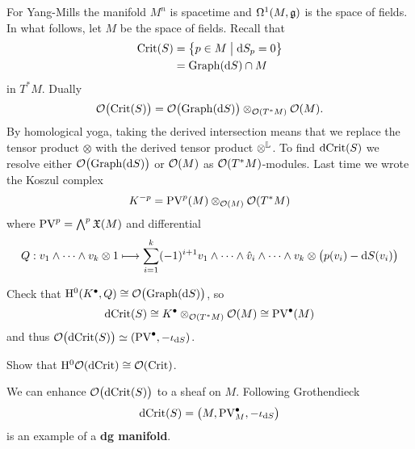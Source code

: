For Yang-Mills the manifold $M^n$ is spacetime and $\Omega^1(M, \mathfrak{g})$ is the space of fields. In what follows, let $M$ be the space of fields. Recall that
\begin{align*}
  \operatorname{Crit}(S) &= \bigl\{ p \in M \bigm| \mathrm{d} S_p = 0 \bigr\} \\
           &= \operatorname{Graph} (\mathrm{d} S) \cap M
\end{align*}
in $T^* M$. Dually
\begin{equation*}
  \mathcal{O} \bigl( \operatorname{Crit}(S) \bigr)
  = \mathcal{O} \bigl( \operatorname{Graph} (\mathrm{d} S) \bigr) \otimes_{\mathcal{O}(T^* M)} \mathcal{O}(M).
\end{equation*}
By homological yoga, taking the derived intersection means that we replace the tensor product $\otimes$ with the derived tensor product $\otimes^{\mathbb{L}}$. To find $\operatorname{dCrit} (S)$ we resolve either $\mathcal{O} \bigl( \operatorname{Graph} (\mathrm{d} S) \bigr)$ or $\mathcal{O}(M)$ as $\mathcal{O}(T^* M)$-modules. Last time we wrote the Koszul complex
\begin{equation*}
  K^{-p} = \operatorname{PV}^p (M) \otimes_{\mathcal{O}(M)} \mathcal{O} (T^* M)
\end{equation*}
where $\operatorname{PV}^p = \bigwedge^p \mathfrak{X}(M)$ and differential
\begin{equation*}
  Q : v_1 \wedge \dots \wedge v_k \otimes 1 \longmapsto
  \sum_{i=1}^k (-1)^{i+1} v_1 \wedge \dots \wedge \hat{v}_i \wedge \dots \wedge v_k
  \otimes \bigl( p(v_i) - \mathrm{d} S(v_i) \bigr)
\end{equation*}

\begin{exercise}
  Check that $\mathrm{H}^0 (K^{\bullet}, Q) \cong \mathcal{O} \bigl( \operatorname{Graph} (\mathrm{d} S) \bigr)$, so
  \begin{equation*}
    \operatorname{dCrit} (S) \cong K^{\bullet} \otimes_{\mathcal{O}(T^* M)} \mathcal{O} (M) \cong \operatorname{PV}^{\bullet} (M)
  \end{equation*}
  and thus $\mathcal{O} \bigl( \operatorname{dCrit}(S) \bigr) \simeq (\operatorname{PV}^\bullet, - \iota_{\mathrm{d} S})$.
\end{exercise}

\begin{exercise}
   Show that $\mathrm{H}^0 \mathcal{O}( \operatorname{dCrit} ) \cong \mathcal{O} (\operatorname{Crit})$.
\end{exercise}

We can enhance $\mathcal{O} \bigl( \operatorname{dCrit} (S) \bigr)$ to a sheaf on $M$. Following Grothendieck
\begin{equation*}
  \operatorname{dCrit}(S) = \bigl( M, \operatorname{PV}_M^\bullet, - \iota_{\mathrm{d} S} \bigr)
\end{equation*}
is an example of a \textbf{dg manifold}.

